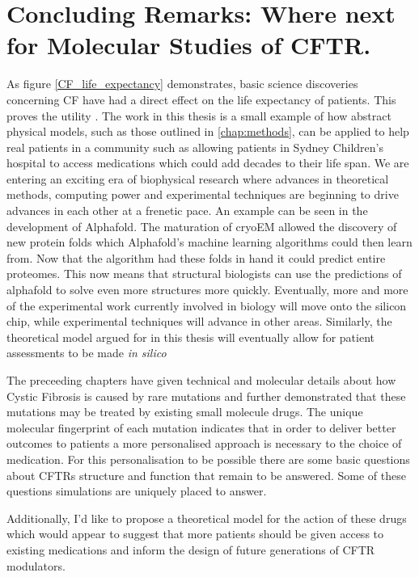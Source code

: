\chapter{Concluding Remarks: Where next for Molecular Studies of CFTR.}
\label{chap:conclusion}

As figure \ref{CF_life_expectancy} demonstrates, basic science discoveries concerning CF have had a direct effect on the life expectancy of patients. This proves the utility . The work in this thesis is a small example of how abstract physical models, such as those outlined in \ref{chap:methods}, can be applied to help real patients in a community such as allowing patients in Sydney Children's hospital to access medications which could add decades to their life span. We are entering an exciting era of biophysical research where advances in theoretical methods, computing power and experimental techniques are beginning to drive advances in each other at a frenetic pace. An example can be seen in the development of Alphafold. The maturation of cryoEM allowed the discovery of new protein folds which Alphafold's machine learning algorithms could then learn from. Now that the algorithm had these folds in hand it could predict entire proteomes. This now means that structural biologists can use the predictions of alphafold to solve even more structures more quickly. Eventually, more and more of the experimental work currently involved in biology will move onto the silicon chip, while experimental techniques will advance in other areas. Similarly, the theoretical model argued for in this thesis will eventually allow for patient assessments to be made \textit{in silico}

The preceeding chapters have given technical and molecular details about how Cystic Fibrosis is caused by rare mutations and further demonstrated that these mutations may be treated by existing small molecule drugs. The unique molecular fingerprint of each mutation indicates that in order to deliver better outcomes to patients a more personalised approach is necessary to the choice of medication. For this personalisation to be possible there are some basic questions about CFTRs structure and function that remain to be answered. Some of these questions simulations are uniquely placed to answer. 

Additionally, I'd like to propose a theoretical model for the action of these drugs which would appear to suggest that more patients should be given access to existing medications and inform the design of future generations of CFTR modulators. 

